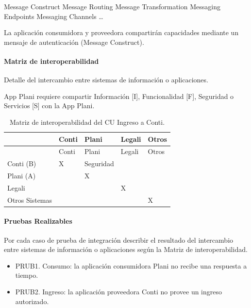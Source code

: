 \documentclass[
  paper=a4,
  ,captions=tableheading
]{scrartcl}
\providecommand{\tightlist}{%
  \setlength{\itemsep}{0pt}\setlength{\parskip}{0pt}}
\begin{document}
Message Construct \textbar{} Message Routing \textbar{} Message
Transformation \textbar{} Messaging Endpoints \textbar{} Messaging
Channels \textbar{} \ldots{}

La aplicación consumidora y proveedora compartirán capacidades mediante
un mensaje de autenticación (Message Construct).

\paragraph{Matriz de
interoperabilidad}\label{sec:matriz-de-interoperabilidad}

Detalle del intercambio entre sistemas de información o aplicaciones.

App Plani requiere compartir Información {[}I{]}, Funcionalidad {[}F{]},
Seguridad o Servicios {[}S{]} con la App Plani.

\begin{longtable}[]{@{}lllll@{}}
\caption{Matriz de interoperabilidad del CU Ingreso a
Conti.}\tabularnewline
\toprule\noalign{}
& Conti & Plani & Legali & Otros \\
\midrule\noalign{}
\endfirsthead
\toprule\noalign{}
& Conti & Plani & Legali & Otros \\
\midrule\noalign{}
\endhead
\bottomrule\noalign{}
\endlastfoot
Conti (B) & X & Seguridad & & \\
Plani (A) & & X & & \\
Legali & & & X & \\
Otros Sistemas & & & & X \\
\end{longtable}

\paragraph{Pruebas Realizables}\label{sec:pruebas-realizables}

Por cada caso de prueba de integración describir el resultado del
intercambio entre sistemas de información o aplicaciones según la Matriz
de interoperabilidad.

\begin{itemize}
\tightlist
\item
  PRUB1. Consumo: la aplicación consumidora Plani no recibe una
  respuesta a tiempo.
\item
  PRUB2. Ingreso: la aplicación proveedora Conti no provee un ingreso
  autorizado.
\end{itemize}
\end{document}
